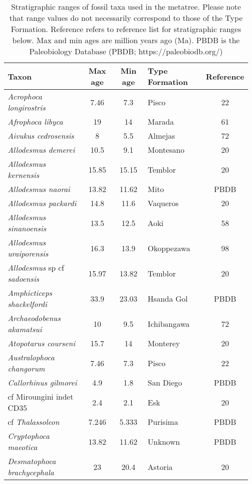 \begin{longtable}{p{}cclc}

\caption{Stratigraphic ranges of fossil taxa used in the metatree. Please note that range values do not necessarily correspond to those of the Type Formation. Reference refers to reference list for stratigraphic ranges below. Max and min ages are million years ago (Ma). PBDB is the Paleobiology Database (PBDB; https://paleobiodb.org/)}\\

\hline
\textbf{Taxon} & \textbf{Max age} & \textbf{Min age} & \textbf{Type Formation} & \textbf{Reference}\\
\hline
\textit{Acrophoca longirostris} & 	7.46	&	7.3	&	Pisco	&22\\
\textit{Afrophoca libyca} & 	19	&	14	&	Marada	& 61\\
\textit{Aivukus cedrosensis} & 	8	&	5.5	&	Almejas	&72\\
\textit{Allodesmus demerei} & 	10.5	&	9.1	&	Montesano	&20\\
\textit{Allodesmus kernensis} & 	15.85	&	15.15	&	Temblor	&20\\
\textit{Allodesmus naorai} & 	13.82	&	11.62	&	Mito	&PBDB\\
\textit{Allodesmus packardi} & 	14.8	&	11.6	&	Vaqueros	&20\\
\textit{Allodesmus sinanoensis} & 	13.5	&	12.5	&	Aoki	&58\\
\textit{Allodesmus uraiporensis} & 	16.3	&	13.9	&	Okoppezawa	&98\\
\textit{Allodesmus} sp cf \textit{sadoensis} & 	15.97	&	13.82	&	Temblor	&20\\
\textit{Amphicticeps shackelfordi} & 	33.9	&	23.03	&	Hsanda Gol	&PBDB\\
\textit{Archaeodobenus akamatsui} & 	10	&	9.5	&	Ichibangawa	&72\\
\textit{Atopotarus courseni} & 	15.7	&	14	&	Monterey	&20\\
\textit{Australophoca changorum} & 	7.46	&	7.3	&	Pisco	&22\\
\textit{Callorhinus gilmorei} & 	4.9	&	1.8	&	San Diego	&PBDB\\
cf Miroungini indet CD35 & 	2.4	&	2.1	&	Esk	&20\\
cf \textit{Thalassoleon} & 	7.246	&	5.333	&	Purisima	&PBDB\\
\textit{Cryptophoca maeotica} & 	13.82	&	11.62	&	Unknown	&PBDB\\
\textit{Desmatophoca brachycephala} & 	23	&	20.4	&	Astoria	&20\\

\end{longtable}
